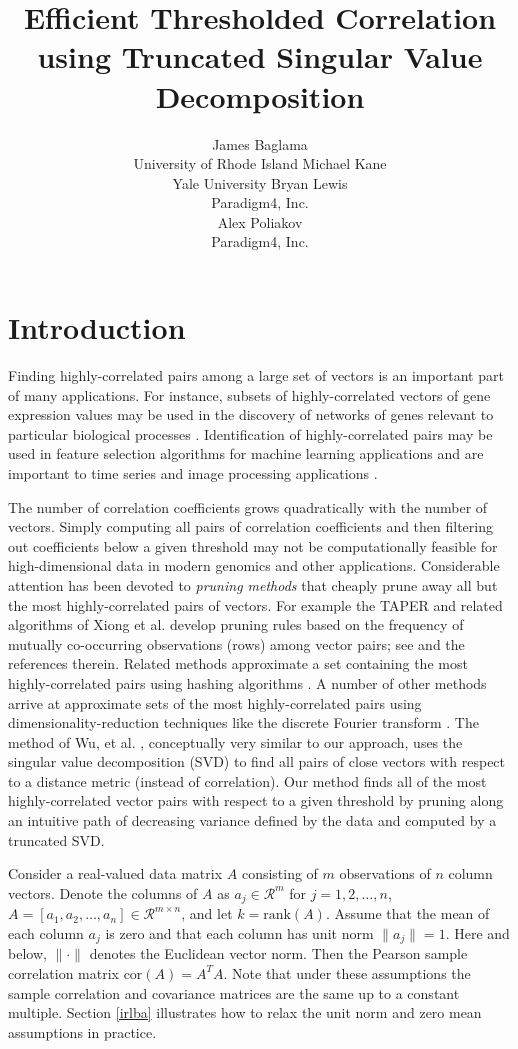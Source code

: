 \documentclass[article]{jss}
\title{Efficient Thresholded Correlation using Truncated Singular Value Decomposition}
\author{
James Baglama\\
University of Rhode Island
\And
Michael Kane\\
Yale University
\AND
Bryan Lewis\\
Paradigm4, Inc.\\
\And
Alex Poliakov\\
Paradigm4, Inc.
}
\numberwithin{algorithmctr}{section}
\begin{document}
\section{Introduction}\label{intro}

Finding highly-correlated pairs among a large set of vectors is an important
part of many applications. For instance, subsets of highly-correlated vectors
of gene expression values may be used in the discovery of networks of genes
relevant to particular biological processes \citep{genomics}.  Identification of
highly-correlated pairs may be used in feature selection algorithms for machine
learning applications \citep{ml1, ml2} and are important to time series and
image processing applications \citep{timeseries, svd-similarity}.

The number of correlation coefficients grows quadratically with the number of
vectors. Simply computing all pairs of correlation coefficients and then
filtering out coefficients below a given threshold may not be computationally
feasible for high-dimensional data in modern genomics and other applications.
Considerable attention has been devoted to \emph{pruning
methods} that cheaply prune away all but the most highly-correlated pairs of
vectors.  For example the TAPER and related algorithms of Xiong et al. develop
pruning rules based on the frequency of mutually co-occurring observations (rows)
among vector pairs; see \citep{prune1, prune2} and the references therein.
Related methods approximate a set containing the most highly-correlated
pairs using hashing algorithms \citep{prune3}. A number of other methods arrive
at approximate sets of the most highly-correlated pairs using
dimensionality-reduction techniques like the discrete Fourier
transform \citep{timeseries}. The method of Wu, et al. \citep{svd-similarity},
conceptually very similar to our approach, uses the singular value
decomposition (SVD) to find all pairs of close vectors with respect to a
distance metric (instead of correlation).  Our method finds all of the most
highly-correlated vector pairs with respect to a given threshold by pruning
along an intuitive path of decreasing variance defined by the data and computed
by a truncated SVD.

Consider a real-valued data matrix $A$ consisting of $m$ observations of $n$
column vectors.  Denote the columns of $A$ as $a_j\in\mathcal{R}^m$ for
$j=1,2,\ldots,n$, $A=[a_1, a_2, \ldots, a_n]\in\mathcal{R}^{m\times n}$, and
let $k=\mathrm{rank}(A)$.  Assume that the mean of each column $a_j$ is zero
and that each column has unit norm $\|a_j\| = 1$. Here and below, $\|\cdot\|$
denotes the Euclidean vector norm. Then the Pearson sample correlation matrix
$\mathrm{cor}(A)=A^TA$.  Note that under these assumptions the sample
correlation and covariance matrices are the same up to a constant multiple.
Section \ref{irlba} illustrates how to relax the unit norm and zero mean
assumptions in practice.
\end{document}
